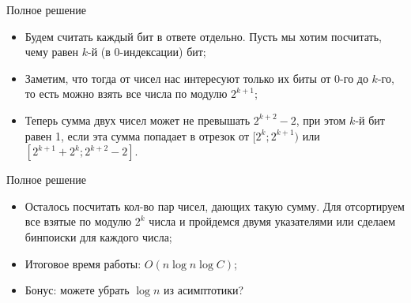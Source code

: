 \begin{frame}{Полное решение}
  \begin{itemize}
      \item Будем считать каждый бит в ответе отдельно. Пусть мы хотим посчитать, чему равен $k$-й (в 0-индексации) бит;
      \item Заметим, что тогда от чисел нас интересуют только их биты от $0$-го до $k$-го, то есть можно взять все числа по модулю $2^{k + 1}$;
      \item Теперь сумма двух чисел может не превышать $2^{k + 2} - 2$, при этом $k$-й бит равен 1, если эта сумма попадает в отрезок от $[2^k; 2^{k + 1})$ или $[2^{k + 1} + 2^k; 2^{k + 2} - 2]$.
  \end{itemize}
\end{frame}

\begin{frame}{Полное решение}
  \begin{itemize}
      \item Осталось посчитать кол-во пар чисел, дающих такую сумму. Для отсортируем все взятые по модулю $2^k$ числа и пройдемся двумя указателями или сделаем бинпоиски для каждого числа;
      \item Итоговое время работы: $O(n \log n \log C)$;
      \item Бонус: можете убрать $\log n$ из асимптотики?
  \end{itemize}
\end{frame}
